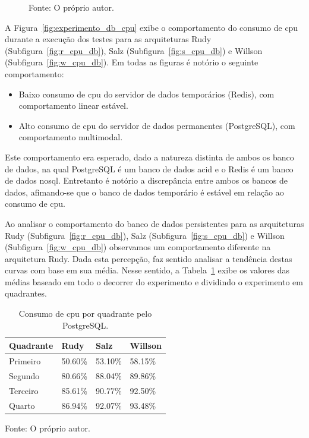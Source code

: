 \begin{figure}[htb!]
    Fonte: O próprio autor.
\end{figure}


A Figura~\ref{fig:experimento_db_cpu} exibe o comportamento do consumo de \ac{cpu} durante a execução dos testes para as arquiteturas Rudy (Subfigura~\ref{fig:r_cpu_db}), Salz (Subfigura~\ref{fig:s_cpu_db}) e Willson (Subfigura~\ref{fig:w_cpu_db}).
%
Em todas as figuras é notório o seguinte comportamento:

\begin{itemize}
 \item Baixo consumo de \ac{cpu} do servidor de dados temporários (Redis), com comportamento linear estável.
 \item Alto consumo de \ac{cpu} do servidor de dados permanentes (PostgreSQL), com comportamento multimodal.
\end{itemize}

Este comportamento era esperado, dado a natureza distinta de ambos os banco de dados, na qual PostgreSQL é um banco de dados \ac{acid} e o Redis é um banco de dados \ac{nosql}.
%
Entretanto é notório a discrepância entre ambos os bancos de dados, afimando-se que o banco de dados temporário é estável em relação ao consumo de \ac{cpu}.

Ao analisar o comportamento do banco de dados persistentes para as arquiteturas Rudy (Subfigura~\ref{fig:r_cpu_db}), Salz (Subfigura~\ref{fig:s_cpu_db}) e Willson (Subfigura~\ref{fig:w_cpu_db}) observamos um comportamento diferente na arquitetura Rudy.
%
Dada esta percepção, faz sentido analisar a tendência destas curvas com base em sua média.
%
Nesse sentido, a Tabela~\ref{tab:cpu_db_media_quadrantes} exibe os valores das médias baseado em todo o decorrer do experimento e dividindo o experimento em quadrantes.

\begin{table}[htb!]
\centering
\begin{adjustbox}{max width=\textwidth}
\caption{Consumo de \ac{cpu} por quadrante pelo PostgreSQL.}
\label{tab:cpu_db_media_quadrantes}
\begin{tabular}{|l|l|l|l|}

\hline

Quadrante & Rudy    & Salz    & Willson \\ \hline

Primeiro  & 50.60\% & 53.10\% & 58.15\% \\ \hline

Segundo   & 80.66\% & 88.04\% & 89.86\% \\ \hline

Terceiro  & 85.61\% & 90.77\% & 92.50\% \\ \hline

Quarto    & 86.94\% & 92.07\% & 93.48\% \\ \hline

\end{tabular}

\end{adjustbox}

Fonte: O próprio autor.
\end{table}

